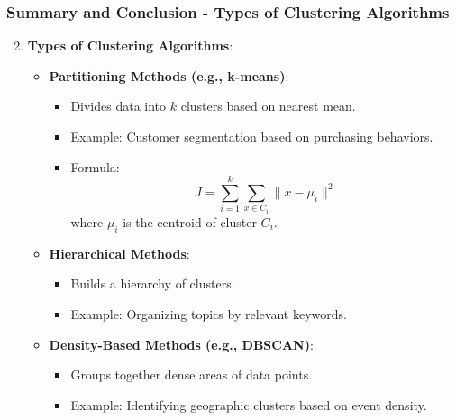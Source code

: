 \documentclass[aspectratio=169]{beamer}
\begin{document}
\begin{frame}[fragile]
    \frametitle{Summary and Conclusion - Types of Clustering Algorithms}
    \begin{enumerate}
        \setcounter{enumi}{1}
        \item \textbf{Types of Clustering Algorithms}:
        \begin{itemize}
            \item \textbf{Partitioning Methods (e.g., k-means)}:
            \begin{itemize}
                \item Divides data into \( k \) clusters based on nearest mean.
                \item Example: Customer segmentation based on purchasing behaviors.
                \item Formula:
                \begin{equation}
                J = \sum_{i=1}^{k} \sum_{x \in C_i} \|x - \mu_i\|^2
                \end{equation}
                where \( \mu_i \) is the centroid of cluster \( C_i \).
            \end{itemize}
            \item \textbf{Hierarchical Methods}:
            \begin{itemize}
                \item Builds a hierarchy of clusters.
                \item Example: Organizing topics by relevant keywords.
            \end{itemize}
            \item \textbf{Density-Based Methods (e.g., DBSCAN)}:
            \begin{itemize}
                \item Groups together dense areas of data points.
                \item Example: Identifying geographic clusters based on event density.
            \end{itemize}
        \end{itemize}
    \end{enumerate}
\end{frame}
\end{document}
